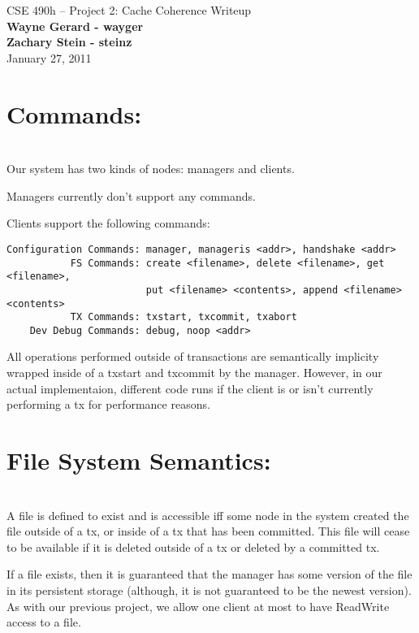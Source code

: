 \documentclass[11pt]{article}
\begin{document}
\begin{center}
{\large CSE 490h -- Project 2: Cache Coherence Writeup} \\
\textbf{Wayne Gerard - wayger} \\
\textbf{Zachary Stein - steinz} \\
January 27, 2011
\end{center}

\section{Commands:} \\

Our system has two kinds of nodes: managers and clients.

Managers currently don't support any commands.

Clients support the following commands:
\begin{verbatim}
Configuration Commands: manager, manageris <addr>, handshake <addr>
           FS Commands: create <filename>, delete <filename>, get <filename>, 
                        put <filename> <contents>, append <filename> <contents>
           TX Commands: txstart, txcommit, txabort
    Dev Debug Commands: debug, noop <addr>
\end{verbatim}

All operations performed outside of transactions are semantically implicity wrapped inside of a txstart and txcommit by the manager. However, in our actual implementaion, different code runs if the client is or isn't currently performing a tx for performance reasons. \\

\section{File System Semantics:} \\

A file is defined to exist and is accessible iff some node in the system created the file outside of a tx, or inside of a tx that has been committed. 
This file will cease to be available if it is deleted outside of a tx or deleted by a committed tx.

If a file exists, then it is guaranteed that the manager has some version of the file in its persistent storage (although, it is not guaranteed to be the newest version). 
As with our previous project, we allow one client at most to have ReadWrite access to a file. 
\end{document}
